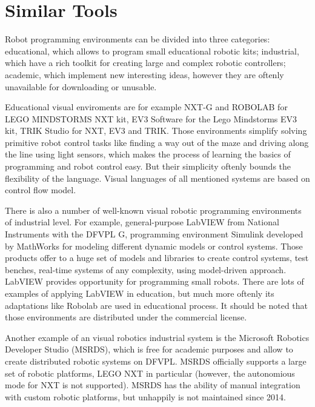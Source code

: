 \documentclass[conference,compsoc]{IEEEtran}
\begin{document}
\section{Similar Tools}
\label{sec:Overview}
Robot programming environments can be divided into three categories: educational, which allows to program small educational robotic kits; industrial, which have a rich toolkit for creating large and complex robotic controllers; academic, which implement new interesting ideas, however they are oftenly unavailable for downloading or unusable.

Educational visual enviroments are for example NXT-G and ROBOLAB for LEGO MINDSTORMS NXT kit, EV3 Software for the Lego Mindstorms EV3 kit, TRIK Studio for NXT, EV3 and TRIK. Those environments simplify solving primitive robot control tasks like finding a way out of the maze and driving along the line using light sensors, which makes the process of learning the basics of programming and robot control easy. But their simplicity oftenly bounds the flexibility of the language. Visual languages of all mentioned systems are based on control flow model.

There is also a number of well-known visual robotic programming environments of industrial level. For example, general-purpose LabVIEW from National Instruments with the DFVPL G, programming environment Simulink developed by MathWorks for modeling different dynamic models or control systems. Those products offer to a huge set of models and libraries to create control systems, test benches, real-time systems of any complexity, using model-driven approach. LabVIEW provides opportunity for programming small robots. There are lots of examples of applying LabVIEW in education\cite{erwin2000lego, 1_gomez-de-gabriel_mandow_fernandez-lozano_garcia-cerezo_2011}, but much more oftenly its adaptations like Robolab are used in educational process. It should be noted that those environments are distributed under the commercial license.

Another example of an visual robotics industrial system is the Microsoft Robotics Developer Studio (MSRDS)\cite{jackson2007microsoft}, which is free for academic purposes and allow to create distributed robotic systems on DFVPL. MSRDS officially supports a large set of robotic platforms, LEGO NXT\cite{kim2007programming} in particular (however, the autonomious mode for NXT is not supported). MSRDS has the ability of manual integration with custom robotic platforms, but unhappily is not maintained since 2014.
\end{document}
